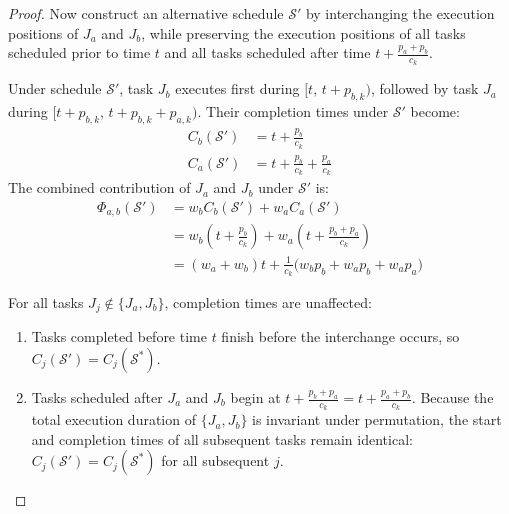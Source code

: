 \documentclass[conference]{IEEEtran}
\begin{document}
\begin{proof}
Now construct an alternative schedule $\mathcal{S}'$ by interchanging the execution positions of $J_a$ and $J_b$, while preserving the execution positions of all tasks scheduled prior to time $t$ and all tasks scheduled after time $t + \frac{p_a + p_b}{c_k}$.

Under schedule $\mathcal{S}'$, task $J_b$ executes first during $[t, \, t + p_{b,k})$, followed by task $J_a$ during $[t + p_{b,k}, \, t + p_{b,k} + p_{a,k})$. Their completion times under $\mathcal{S}'$ become:
\begin{align}
C_b(\mathcal{S}') &= t + \frac{p_b}{c_k} \\
C_a(\mathcal{S}') &= t + \frac{p_b}{c_k} + \frac{p_a}{c_k}
\end{align}
The combined contribution of $J_a$ and $J_b$ under $\mathcal{S}'$ is:
\begin{align}
\Phi_{a,b}(\mathcal{S}') &= w_b C_b(\mathcal{S}') + w_a C_a(\mathcal{S}') \nonumber \\
&= w_b \left( t + \frac{p_b}{c_k} \right) + w_a \left( t + \frac{p_b + p_a}{c_k} \right) \nonumber \\
&= (w_a + w_b)t + \frac{1}{c_k} \Big( w_b p_b + w_a p_b + w_a p_a \Big)
\end{align}

For all tasks $J_j \notin \{J_a, J_b\}$, completion times are unaffected:
\begin{enumerate}
    \item Tasks completed before time $t$ finish before the interchange occurs, so $C_j(\mathcal{S}') = C_j(\mathcal{S}^*)$.
    \item Tasks scheduled after $J_a$ and $J_b$ begin at $t + \frac{p_b + p_a}{c_k} = t + \frac{p_a + p_b}{c_k}$. Because the total execution duration of $\{J_a, J_b\}$ is invariant under permutation, the start and completion times of all subsequent tasks remain identical: $C_j(\mathcal{S}') = C_j(\mathcal{S}^*)$ for all subsequent $j$.
\end{enumerate}


\end{proof}
\end{document}
